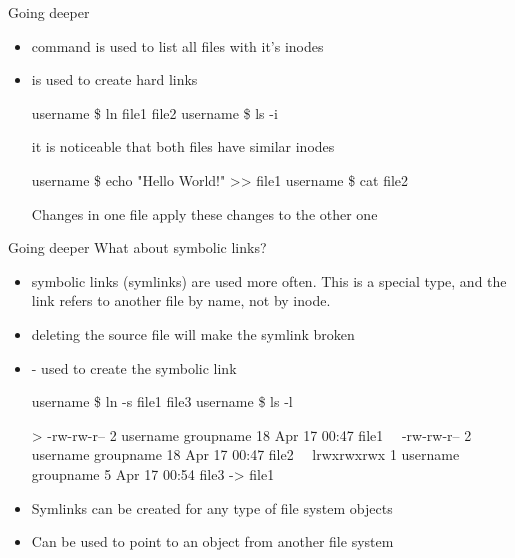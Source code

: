 \documentclass[usenames,dvipsnames,10pt,aspectratio=169]{beamer}
\begin{document}
\begin{frame}{Going deeper}
    \begin{itemize}
        \item {} command is used to list all files with it's inodes
        \item {} is used to create hard links
        \begin{examples}
            username \$ ln file1 file2 \newline
            username \$ ls -i \newline
        \end{examples}
        it is noticeable that both files have similar inodes
        \begin{examples}
        username \$ echo "Hello World!" >> file1 \newline
        username \$ cat file2 \newline
        \end{examples}
        Changes in one file apply these changes to the other one \newline
    \end{itemize}
\end{frame}

\begin{frame}{Going deeper}
    What about symbolic links?
    \begin{itemize}
        \item symbolic links (symlinks) are used more often. This is a special type, and the link refers to another file by name, not by inode.
        \item deleting the source file will make the symlink broken
        \item {} - used to create the symbolic link
        \begin{examples}
        username \$ ln -s file1 file3 \newline
        username \$ ls -l \newline
        
        > -rw-rw-r-- 2 username groupname 18 Apr 17 00:47 file1 \newline
        \, \, -rw-rw-r-- 2 username groupname 18 Apr 17 00:47 file2 \newline
        \, \, lrwxrwxrwx 1 username groupname  5 Apr 17 00:54 file3 -> file1
        \end{examples}
        \item Symlinks can be created for any type of file system objects
        \item Can be used to point to an object from another file system
    \end{itemize}
\end{frame}
\end{document}
